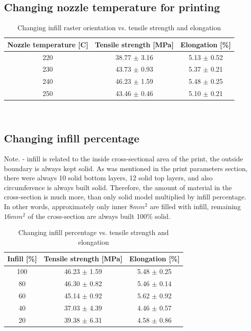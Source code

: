\documentclass[a4paper, 11pt, reqno]{report}
\begin{document}
\subsection{Changing nozzle temperature for printing}
\begin{table}[h!]
\begin{tabular}{|c|c|c|}
\hline 
Nozzle temperature [C] & Tensile strength [MPa] & Elongation [\%]\\ 
\hline 
220 & 38.77 $\pm$ 3.16 & 5.13 $\pm$ 0.52\\ 
\hline 
230 & 43.73 $\pm$ 0.93 & 5.37 $\pm$ 0.21 \\ 
\hline 
240 & 46.23 $\pm$ 1.59 & 5.48 $\pm$ 0.25 \\ 
\hline 
250 & 43.46 $\pm$ 0.46 & 5.10 $\pm$ 0.21\\ 
\hline 
\end{tabular}
\\
\begin{minipage}{0.8\textwidth}
\caption{Changing infill raster orientation vs. tensile strength and elongation}
\end{minipage}
\end{table}
%
\subsection{Changing infill percentage}
Note. - infill is related to the inside cross-sectional area of the print, the outside boundary is always kept solid. As was mentioned in the print parameters section, there were always 10 solid bottom layers, 12 solid top layers, and also circumference is always built solid. Therefore, the amount of material in the cross-section is much more, than only solid model multiplied by infill percentage. In other words, approximately only inner $8mm^2$ are filled with infill, remaining $16mm^2$ of the cross-section are always built 100\% solid.
\begin{table}[h!]
\begin{tabular}{|c|c|c|}
\hline 
Infill [\%] & Tensile strength [MPa] & Elongation [\%]\\ 
\hline 
100 & 46.23 $\pm$ 1.59 & 5.48 $\pm$ 0.25\\ 
\hline 
80 & 46.30 $\pm$ 0.82 & 5.46 $\pm$ 0.14\\ 
\hline 
60 & 45.14 $\pm$ 0.92 & 5.62 $\pm$ 0.92\\ 
\hline 
40 & 37.03 $\pm$ 4.39 & 4.46 $\pm$ 0.57\\ 
\hline
20 & 39.38 $\pm$ 6.31 & 4.58 $\pm$ 0.86\\ 
\hline
\end{tabular}
\\
\begin{minipage}{0.75\textwidth}
\caption[justification=justified,singlelinecheck=false]{Changing infill percentage vs. tensile strength and elongation}
\end{minipage}
\end{table}
%
\end{document}
